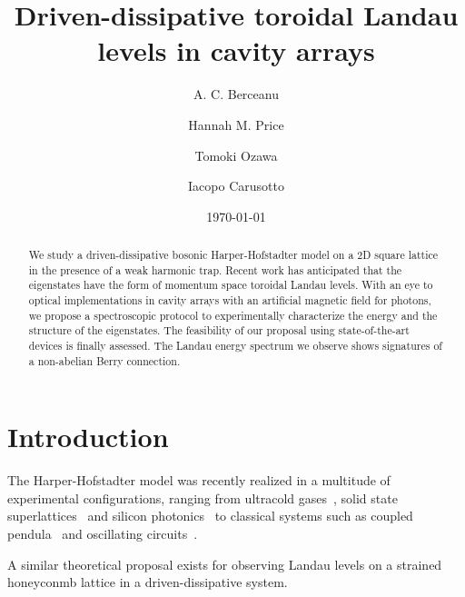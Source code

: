 \documentclass[twocolumn, 10pt, aps, superscriptaddress, floatfix, showpacs, pra, citeautoscript]{revtex4-1}
\begin{document}
\title{Driven-dissipative toroidal Landau levels in cavity arrays}


\author{A. C. Berceanu}
\author{Hannah M. Price}
\author{Tomoki Ozawa}
\author{Iacopo Carusotto}

\date{\today}

\begin{abstract}
  We study a driven-dissipative bosonic Harper-Hofstadter model on a
  2D square lattice in the presence of a weak harmonic trap. Recent
  work has anticipated that the eigenstates have the form of momentum
  space toroidal Landau levels. With an eye to optical implementations
  in cavity arrays with an artificial magnetic field for photons, we
  propose a spectroscopic protocol to experimentally characterize the
  energy and the structure of the eigenstates. The feasibility of our
  proposal using state-of-the-art devices is finally assessed.  The
  Landau energy spectrum we observe shows signatures of a non-abelian
  Berry connection.
\end{abstract}

\maketitle


\section{Introduction}
The Harper-Hofstadter model was recently realized in a multitude of
experimental configurations, ranging from ultracold
gases~\cite{aidelsburger2013hh,miyake2013hh}, solid state
superlattices~\cite{dean2013hofstadter,yu2014hierarchy} and silicon
photonics~\cite{hafezi2013imaging} to classical systems such as
coupled pendula~\cite{susstrunk2015pendula} and oscillating
circuits~\cite{jia2013circuits}.

A similar theoretical proposal exists for observing Landau levels on a
strained honeyconmb lattice in a driven-dissipative
system.~\cite{salerno2015graphene}
\end{document}
